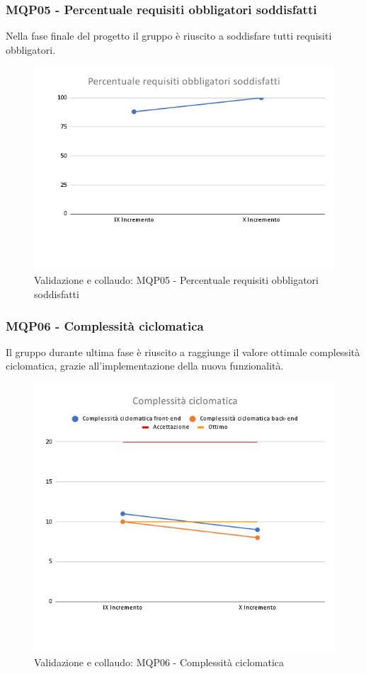 \subsubsection{MQP05 - Percentuale requisiti obbligatori soddisfatti}
Nella fase finale del progetto il gruppo è riuscito a soddisfare tutti requisiti obbligatori.
\begin{figure}[H]
    \centering
    \includegraphics[scale=0.50]{Sezioni/images/last_prodotto/Percentuale_requisiti_obbligatori_soddisfatti.png}
    \caption{Validazione e collaudo: MQP05 - Percentuale requisiti obbligatori soddisfatti}
\end{figure}
\subsubsection{MQP06 - Complessità ciclomatica}
Il gruppo durante ultima fase è riuscito a raggiunge il valore ottimale complessità ciclomatica, grazie all'implementazione della nuova funzionalità.
\begin{figure}[H]
    \centering
    \includegraphics[scale=0.50]{Sezioni/images/last_prodotto/Complessita_ciclomatica.png}
    \caption{Validazione e collaudo: MQP06 - Complessità ciclomatica}
\end{figure}
